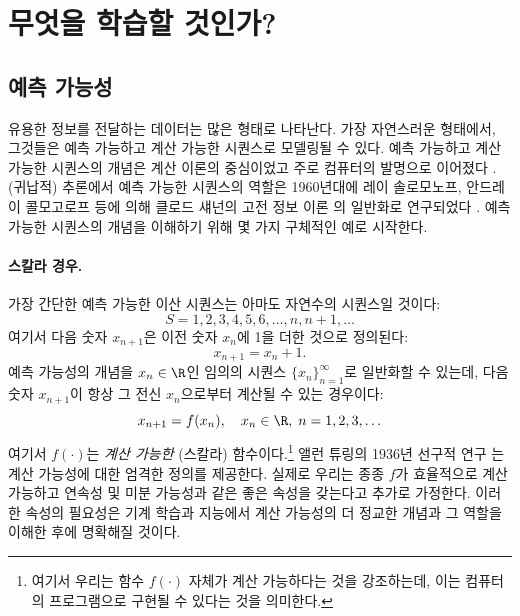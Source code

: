 \documentclass[../../book-main_ko.tex]{subfiles}
\begin{document}
\section{무엇을 학습할 것인가?}
\label{sec:what-to-learn}

\subsection{예측 가능성}
\label{sec:predictability}
유용한 정보를 전달하는 데이터는 많은 형태로 나타난다. 가장 자연스러운 형태에서, 그것들은 예측 가능하고 계산 가능한 시퀀스로 모델링될 수 있다. 예측 가능하고 계산 가능한 시퀀스의 개념은 계산 이론의 중심이었고 주로 컴퓨터의 발명으로 이어졌다 \cite{Turing-1936}. (귀납적) 추론에서 예측 가능한 시퀀스의 역할은 1960년대에 레이 솔로모노프, 안드레이 콜모고로프 등에 의해 클로드 섀넌의 고전 정보 이론 \cite{Shannon-1948}의 일반화로 연구되었다 \cite{Kolmogorov1998OnTO}. 예측 가능한 시퀀스의 개념을 이해하기 위해 몇 가지 구체적인 예로 시작한다.

\paragraph{스칼라 경우.} 가장 간단한 예측 가능한 이산 시퀀스는 아마도 자연수의 시퀀스일 것이다:
\begin{equation}
   S = 1, 2, 3, 4, 5, 6, \ldots, n, n+1, \ldots
\end{equation}
여기서 다음 숫자 \(x_{n+1}\)은 이전 숫자 \(x_{n}\)에 1을 더한 것으로 정의된다:
\begin{equation}
    x_{n+1} = x_{n} + 1.
\end{equation}
예측 가능성의 개념을 \(x_{n} \in \R\)인 임의의 시퀀스 \(\{x_{n}\}_{n=1}^{\infty}\)로 일반화할 수 있는데, 다음 숫자 \(x_{n+1}\)이 항상 그 전신 \(x_{n}\)으로부터 계산될 수 있는 경우이다:
\begin{equation}
    x_{n+1} = f(x_{n}), \quad x_{n} \in \R, \; n = 1, 2, 3, \ldots
\end{equation}
여기서 \(f(\cdot)\)는 \textit{계산 가능한} (스칼라) 함수이다.\footnote{여기서 우리는 함수 \(f(\cdot)\) 자체가 계산 가능하다는 것을 강조하는데, 이는 컴퓨터의 프로그램으로 구현될 수 있다는 것을 의미한다.} 앨런 튜링의 1936년 선구적 연구 \cite{Turing-1936}는 계산 가능성에 대한 엄격한 정의를 제공한다. 실제로 우리는 종종 \(f\)가 효율적으로 계산 가능하고 연속성 및 미분 가능성과 같은 좋은 속성을 갖는다고 추가로 가정한다. 이러한 속성의 필요성은 기계 학습과 지능에서 계산 가능성의 더 정교한 개념과 그 역할을 이해한 후에 명확해질 것이다.
\end{document}
